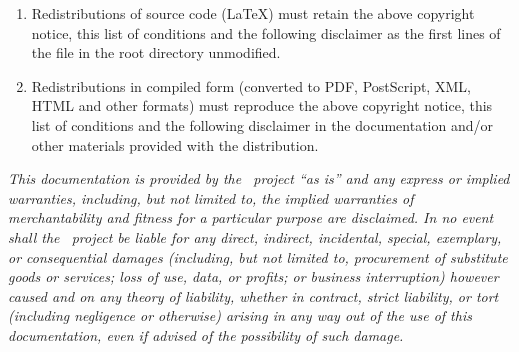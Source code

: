 {\begin{enumerate}
\item
Redistributions of source code (\LaTeX) must retain the above copyright notice,
this list of conditions and the following disclaimer as the first lines of
the file  in the root directory unmodified.
\item
Redistributions in compiled form (converted to PDF, PostScript, XML, HTML and
other formats) must reproduce the above copyright notice, this list of
conditions and the following disclaimer in the documentation and/or other
materials provided with the distribution.
\end{enumerate}

\noindent
{\em This documentation is provided by the \Cloudy\ project ``as is'' and any express
or implied warranties, including, but not limited to, the implied warranties
of merchantability and fitness for a particular purpose are disclaimed. In no
event shall the  \Cloudy\  project be liable for any direct, indirect, incidental,
special, exemplary, or consequential damages (including, but not limited to,
procurement of substitute goods or services; loss of use, data, or profits; or
business interruption) however caused and on any theory of liability, whether
in contract, strict liability, or tort (including negligence or otherwise)
arising in any way out of the use of this documentation, even if advised of
the possibility of such damage.}\par
}
